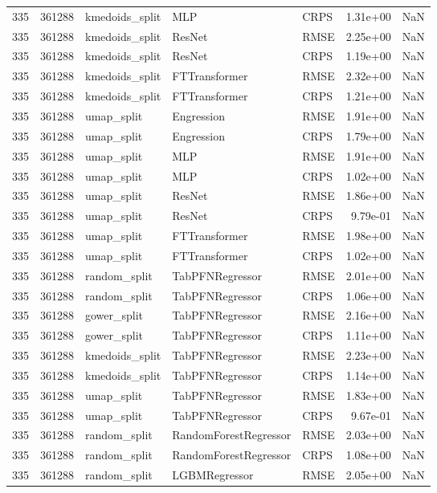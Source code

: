 \begin{tabular}{rrlllrr}
335 & 361288 & kmedoids\_split & MLP & CRPS & 1.31e+00 & NaN \\
335 & 361288 & kmedoids\_split & ResNet & RMSE & 2.25e+00 & NaN \\
335 & 361288 & kmedoids\_split & ResNet & CRPS & 1.19e+00 & NaN \\
335 & 361288 & kmedoids\_split & FTTransformer & RMSE & 2.32e+00 & NaN \\
335 & 361288 & kmedoids\_split & FTTransformer & CRPS & 1.21e+00 & NaN \\
335 & 361288 & umap\_split & Engression & RMSE & 1.91e+00 & NaN \\
335 & 361288 & umap\_split & Engression & CRPS & 1.79e+00 & NaN \\
335 & 361288 & umap\_split & MLP & RMSE & 1.91e+00 & NaN \\
335 & 361288 & umap\_split & MLP & CRPS & 1.02e+00 & NaN \\
335 & 361288 & umap\_split & ResNet & RMSE & 1.86e+00 & NaN \\
335 & 361288 & umap\_split & ResNet & CRPS & 9.79e-01 & NaN \\
335 & 361288 & umap\_split & FTTransformer & RMSE & 1.98e+00 & NaN \\
335 & 361288 & umap\_split & FTTransformer & CRPS & 1.02e+00 & NaN \\
335 & 361288 & random\_split & TabPFNRegressor & RMSE & 2.01e+00 & NaN \\
335 & 361288 & random\_split & TabPFNRegressor & CRPS & 1.06e+00 & NaN \\
335 & 361288 & gower\_split & TabPFNRegressor & RMSE & 2.16e+00 & NaN \\
335 & 361288 & gower\_split & TabPFNRegressor & CRPS & 1.11e+00 & NaN \\
335 & 361288 & kmedoids\_split & TabPFNRegressor & RMSE & 2.23e+00 & NaN \\
335 & 361288 & kmedoids\_split & TabPFNRegressor & CRPS & 1.14e+00 & NaN \\
335 & 361288 & umap\_split & TabPFNRegressor & RMSE & 1.83e+00 & NaN \\
335 & 361288 & umap\_split & TabPFNRegressor & CRPS & 9.67e-01 & NaN \\
335 & 361288 & random\_split & RandomForestRegressor & RMSE & 2.03e+00 & NaN \\
335 & 361288 & random\_split & RandomForestRegressor & CRPS & 1.08e+00 & NaN \\
335 & 361288 & random\_split & LGBMRegressor & RMSE & 2.05e+00 & NaN \\

\end{tabular}
